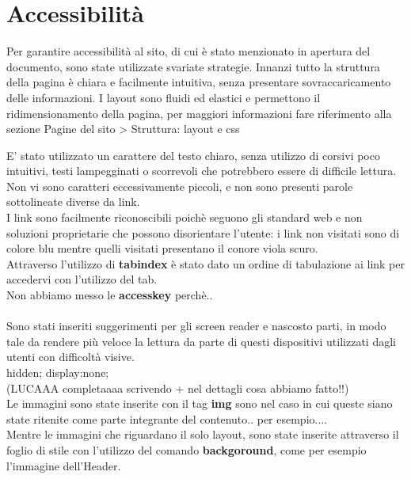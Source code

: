 \section{Accessibilità}

Per garantire accessibilità al sito, di cui è stato menzionato in apertura del documento, sono state utilizzate svariate strategie.
Innanzi tutto la struttura della pagina è chiara e facilmente intuitiva, senza presentare sovraccaricamento delle informazioni.
I layout sono fluidi ed elastici e permettono il ridimensionamento della pagina, per maggiori informazioni fare riferimento alla sezione  Pagine del sito > Struttura: layout e css

E' stato utilizzato un carattere del testo chiaro, senza utilizzo di corsivi poco intuitivi, testi lampegginati o scorrevoli che potrebbero essere di difficile lettura.\\
Non vi sono caratteri eccessivamente piccoli, e non sono presenti parole sottolineate diverse da link.\\

I link sono facilmente riconoscibili poichè seguono gli standard web e non soluzioni proprietarie che possono disorientare l'utente: i link non visitati sono di colore blu mentre quelli visitati presentano il conore viola scuro.\\

Attraverso l'utilizzo di \textbf{tabindex} è stato dato un ordine di tabulazione ai link per accedervi con l'utilizzo del tab.\\

Non abbiamo messo le \textbf{accesskey} perchè..\\
\\

Sono stati inseriti suggerimenti per gli screen reader e nascosto parti, in modo tale da rendere più veloce la lettura da parte di questi dispositivi utilizzati dagli utenti con difficoltà visive.\\
hidden; display:none;\\
(LUCAAA completaaaa scrivendo + nel dettagli cosa abbiamo fatto!!)\\


\n Le immagini sono state inserite con il tag \textbf{img} sono nel caso in cui queste siano state ritenite come parte integrante del contenuto.. per esempio....
\\
Mentre le immagini che riguardano il solo layout, sono state inserite attraverso il foglio di stile con l'utilizzo del comando \textbf{backgoround}, come per esempio l'immagine dell'Header.\\

